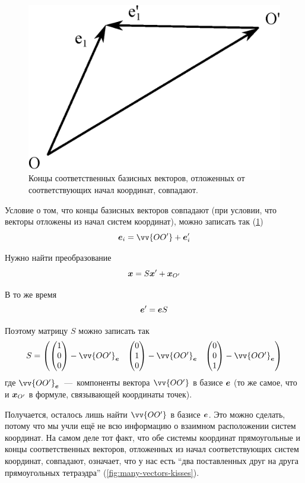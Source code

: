 \documentclass[a4paper,12pt]{article}
\begin{document}
  \begin{solution}
    \begin{figure}[h]
      \centering
    
      \includegraphics[width=0.5\columnwidth]{two-vectors-kiss}
    
      \caption{Концы соответственных базисных векторов, отложенных от соответствующих начал координат, совпадают.}
      \label{fig:two-vectors-kiss}
    \end{figure}
    
    Условие о том, что концы базисных векторов совпадают (при условии, что векторы отложены из начал систем координат), можно записать так (\ref{fig:two-vectors-kiss})
    \[
      \bds e_i = \vv{OO'} + \bds e_i'
    \]
    
    Нужно найти преобразование
    \[
      \boldsymbol x = S \boldsymbol x' + \boldsymbol x_{O'}
    \]
    
    В то же время
    \[
      \boldsymbol e' = \boldsymbol e S
    \]
    
    Поэтому матрицу $S$ можно записать так
    \[
      S = \begin{pmatrix}
        \begin{pmatrix}1\\ 0\\ 0\end{pmatrix} - \vv{OO'}_{\bds e}
        & \begin{pmatrix}0\\ 1\\ 0\end{pmatrix} - \vv{OO'}_{\bds e}
        & \begin{pmatrix}0\\ 0\\ 1\end{pmatrix} - \vv{OO'}_{\bds e}
      \end{pmatrix}
    \]
    где $\vv{OO'}_{\bds e}$~---~компоненты вектора $\vv{OO'}$ в базисе $\boldsymbol e$ (то же самое, что и $\boldsymbol x_{O'}$ в формуле, связывающей координаты точек).
    
    Получается, осталось лишь найти $\vv{OO'}$ в базисе $\boldsymbol e$.
    Это можно сделать, потому что мы учли ещё не всю информацию о взаимном расположении систем координат.
    На самом деле тот факт, что обе системы координат прямоугольные и концы соответственных векторов, отложенных из начал соответствующих систем координат, совпадают, означает, что у нас есть ``два поставленных друг на друга прямоугольных тетраэдра'' (\ref{fig:many-vectors-kisses}).
    

\end{solution}
\end{document}
